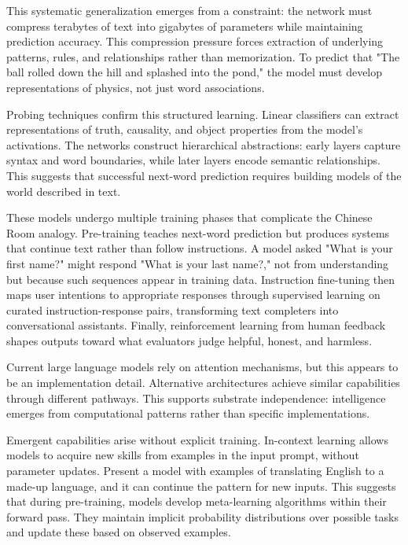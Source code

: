 This systematic generalization emerges from a constraint: the network must compress terabytes of text into gigabytes of parameters while maintaining prediction accuracy. This compression pressure forces extraction of underlying patterns, rules, and relationships rather than memorization. To predict that "The ball rolled down the hill and splashed into the pond," the model must develop representations of physics, not just word associations.

Probing techniques confirm this structured learning. Linear classifiers can extract representations of truth, causality, and object properties from the model's activations. The networks construct hierarchical abstractions: early layers capture syntax and word boundaries, while later layers encode semantic relationships. This suggests that successful next-word prediction requires building models of the world described in text.

These models undergo multiple training phases that complicate the Chinese Room analogy. Pre-training teaches next-word prediction but produces systems that continue text rather than follow instructions. A model asked "What is your first name?" might respond "What is your last name?," not from understanding but because such sequences appear in training data. Instruction fine-tuning then maps user intentions to appropriate responses through supervised learning on curated instruction-response pairs, transforming text completers into conversational assistants. Finally, reinforcement learning from human feedback shapes outputs toward what evaluators judge helpful, honest, and harmless.

Current large language models rely on attention mechanisms, but this appears to be an implementation detail. Alternative architectures achieve similar capabilities through different pathways. This supports substrate independence: intelligence emerges from computational patterns rather than specific implementations.

Emergent capabilities arise without explicit training. In-context learning allows models to acquire new skills from examples in the input prompt, without parameter updates. Present a model with examples of translating English to a made-up language, and it can continue the pattern for new inputs. This suggests that during pre-training, models develop meta-learning algorithms within their forward pass. They maintain implicit probability distributions over possible tasks and update these based on observed examples.

